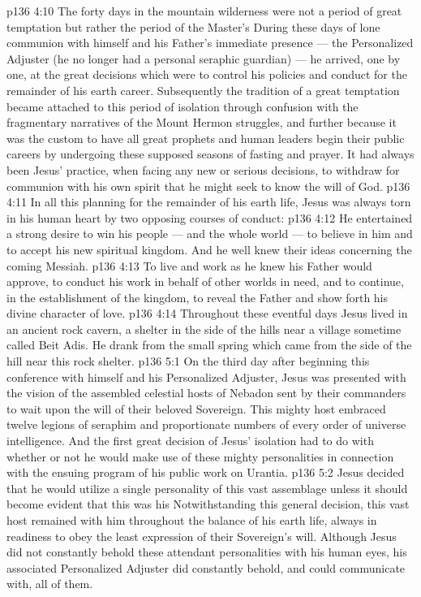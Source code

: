 \vs p136 4:10 \pc The forty days in the mountain wilderness were not a period of great temptation but rather the period of the Master’s  During these days of lone communion with himself and his Father’s immediate presence --- the Personalized Adjuster (he no longer had a personal seraphic guardian) --- he arrived, one by one, at the great decisions which were to control his policies and conduct for the remainder of his earth career. Subsequently the tradition of a great temptation became attached to this period of isolation through confusion with the fragmentary narratives of the Mount Hermon struggles, and further because it was the custom to have all great prophets and human leaders begin their public careers by undergoing these supposed seasons of fasting and prayer. It had always been Jesus’ practice, when facing any new or serious decisions, to withdraw for communion with his own spirit that he might seek to know the will of God.
\vs p136 4:11 \pc In all this planning for the remainder of his earth life, Jesus was always torn in his human heart by two opposing courses of conduct:
\vs p136 4:12 \bibnobreakspace He entertained a strong desire to win his people --- and the whole world --- to believe in him and to accept his new spiritual kingdom. And he well knew their ideas concerning the coming Messiah.
\vs p136 4:13 \bibnobreakspace To live and work as he knew his Father would approve, to conduct his work in behalf of other worlds in need, and to continue, in the establishment of the kingdom, to reveal the Father and show forth his divine character of love.
\vs p136 4:14 \pc Throughout these eventful days Jesus lived in an ancient rock cavern, a shelter in the side of the hills near a village sometime called Beit Adis. He drank from the small spring which came from the side of the hill near this rock shelter.
\vs p136 5:1 On the third day after beginning this conference with himself and his Personalized Adjuster, Jesus was presented with the vision of the assembled celestial hosts of Nebadon sent by their commanders to wait upon the will of their beloved Sovereign. This mighty host embraced twelve legions of seraphim and proportionate numbers of every order of universe intelligence. And the first great decision of Jesus’ isolation had to do with whether or not he would make use of these mighty personalities in connection with the ensuing program of his public work on Urantia.
\vs p136 5:2 Jesus decided that he would  utilize a single personality of this vast assemblage unless it should become evident that this was his  Notwithstanding this general decision, this vast host remained with him throughout the balance of his earth life, always in readiness to obey the least expression of their Sovereign’s will. Although Jesus did not constantly behold these attendant personalities with his human eyes, his associated Personalized Adjuster did constantly behold, and could communicate with, all of them.
